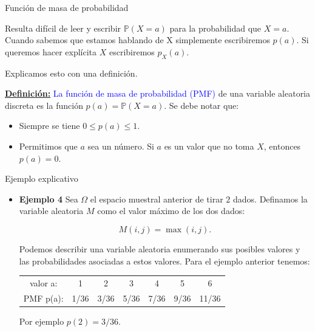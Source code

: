 \documentclass[10pt]{beamer}
\begin{document}
\begin{frame}{Funci\'on de masa de probabilidad }
	
Resulta dif\'icil de leer y escribir $\mathbb{P}(X = a)$ para la probabilidad  que $X = a$. Cuando sabemos que estamos hablando de X simplemente escribiremos $p(a)$. Si queremos hacer expl\'icita  $X$ escribiremos $p_X(a)$.
	
Explicamos esto con  una definici\'on.

\vspace{0.2cm}

\textbf{\small{\underline{Definici\'on:}}} \textcolor{blue}{La funci\'on de masa de probabilidad (PMF)} de una variable aleatoria discreta es la funci\'on $p(a) = \mathbb{P}(X =a)$. Se debe notar que:

\begin{itemize}
	\item Siempre se tiene $0 \leq p(a)\leq 1$.
	\item Permitimos que $a$ sea un n\'umero. Si $a$ es un valor que no toma $X$, entonces $p(a) = 0$.
\end{itemize}

\end{frame}

\begin{frame}{Ejemplo explicativo}

\begin{itemize}
\item \small {\textbf{Ejemplo 4}
Sea $\Omega$ el espacio muestral anterior de tirar $2$ dados. Definamos la variable aleatoria $M$ como el valor m\'aximo de los dos dados:

\[
M(i,j) = \max(i, j).
\]

Podemos describir una variable aleatoria enumerando sus posibles valores y las probabilidades asociadas a estos valores. Para el ejemplo anterior tenemos:

\vspace{0.2cm}

\begin{table}[]
	\centering
	\begin{tabular}{ccccccc}
		valor  a:    & 1    & 2    & 3    & 4    & 5    & 6     \\
		PMF    p(a): & 1/36 & 3/36 & 5/36 & 7/36 & 9/36 & 11/36
	\end{tabular}
\end{table}

\vspace{0.2cm}

Por ejemplo $p(2) = 3/36$.
}
\end{itemize}
\end{frame}
\end{document}
